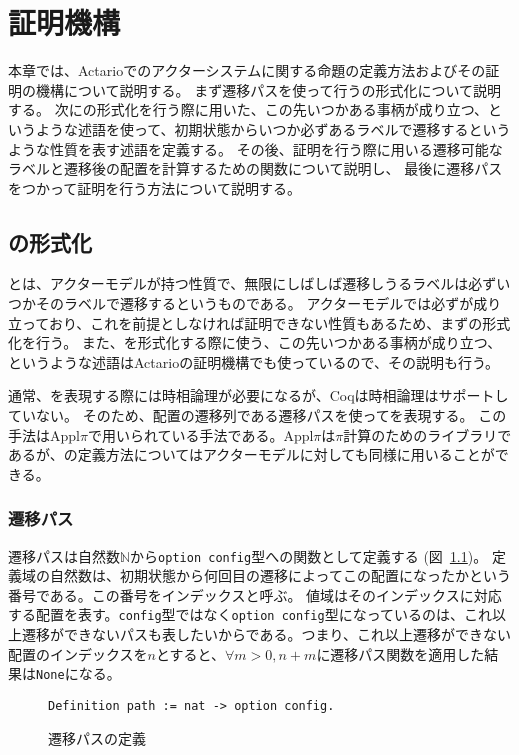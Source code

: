 \chapter{証明機構}
\label{chapter:proof}

本章では、Actarioでのアクターシステムに関する命題の定義方法およびその証明の機構について説明する。
まず遷移パスを使って行う\fairness の形式化について説明する。
次に\fairness の形式化を行う際に用いた、この先いつかある事柄が成り立つ、というような述語を使って、初期状態からいつか必ずあるラベルで遷移するというような性質を表す述語を定義する。
その後、証明を行う際に用いる遷移可能なラベルと遷移後の配置を計算するための関数について説明し、
最後に遷移パスをつかって証明を行う方法について説明する。

\section{\fairness の形式化}
\fairness とは、アクターモデルが持つ性質で、無限にしばしば遷移しうるラベルは必ずいつかそのラベルで遷移するというものである。
アクターモデルでは必ず\fairness が成り立っており、これを前提としなければ証明できない性質もあるため、まず\fairness の形式化を行う。
また、\fairness を形式化する際に使う、この先いつかある事柄が成り立つ、というような述語はActarioの証明機構でも使っているので、その説明も行う。

通常、\fairness を表現する際には時相論理が必要になるが、Coqは時相論理はサポートしていない。
そのため、配置の遷移列である遷移パスを使って\fairness を表現する。
この手法はAppl$\pi$\cite{}で用いられている手法である。Appl$\pi$は$\pi$計算のためのライブラリであるが、\fairness の定義方法についてはアクターモデルに対しても同様に用いることができる。

\subsection{遷移パス}
遷移パスは自然数$\mathbb{N}$から\texttt{option config}型への関数として定義する (図~\ref{code:formalization:path})。
定義域の自然数は、初期状態から何回目の遷移によってこの配置になったかという番号である。この番号をインデックスと呼ぶ。
値域はそのインデックスに対応する配置を表す。\texttt{config}型ではなく\texttt{option config}型になっているのは、これ以上遷移ができないパスも表したいからである。つまり、これ以上遷移ができない配置のインデックスを$n$とすると、$\forall m > 0, n + m$に遷移パス関数を適用した結果は\texttt{None}になる。

\begin{figure}[tp]
\begin{lstlisting}
Definition path := nat -> option config.
\end{lstlisting}
  \label{code:formalization:path}
  \caption{遷移パスの定義}
\end{figure}

